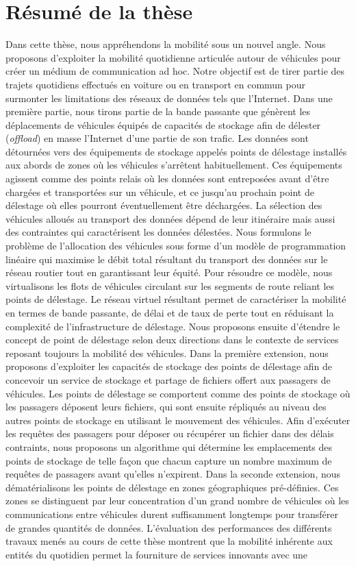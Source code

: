 
\chapter*{Résumé de la thèse}

Dans cette thèse, nous appréhendons la mobilité sous un nouvel angle. Nous proposons d’exploiter la mobilité quotidienne articulée autour de véhicules pour créer un médium de communication ad hoc. Notre objectif est de tirer partie des trajets quotidiens effectués en voiture ou en transport en commun pour surmonter les limitations des réseaux de données tels que l’Internet. Dans une première partie, nous tirons partie de la bande passante que génèrent les déplacements de véhicules équipés de capacités de stockage afin de délester (\textit{offload}) en masse l’Internet d’une partie de son trafic. Les données sont détournées vers des équipements de stockage appelés points de délestage installés aux abords de zones où les véhicules s’arrêtent habituellement. Ces équipements agissent comme des points relais où les données sont entreposées avant d’être chargées et transportées sur un véhicule, et ce jusqu’au prochain point de délestage où elles pourront éventuellement être déchargées. La sélection des véhicules alloués au transport des données dépend de leur itinéraire mais aussi des contraintes qui caractérisent les données délestées. Nous formulons le problème de l’allocation des véhicules sous forme d’un modèle de programmation linéaire qui maximise le débit total résultant du transport des données sur le réseau routier tout en garantissant leur équité. Pour résoudre ce modèle, nous virtualisons les flots de véhicules circulant sur les segments de route reliant les points de délestage. Le réseau virtuel résultant permet de caractériser la mobilité en termes de bande passante, de délai et de taux de perte tout en réduisant la complexité de l’infrastructure de délestage. Nous proposons ensuite d’étendre le concept de point de délestage selon deux directions dans le contexte de services reposant toujours la mobilité des véhicules. Dans la première extension, nous proposons d’exploiter les capacités de stockage des points de délestage afin de concevoir un service de stockage et partage de fichiers offert aux passagers de véhicules. Les points de délestage se comportent comme des points de stockage où les passagers déposent leurs fichiers, qui sont ensuite répliqués au niveau des autres points de stockage en utilisant le mouvement des véhicules. Afin d’exécuter les requêtes des passagers pour déposer ou récupérer un fichier dans des délais contraints, nous proposons un algorithme qui détermine les emplacements des points de stockage de telle façon que chacun capture un nombre maximum de requêtes de passagers avant qu’elles n’expirent. Dans la seconde extension, nous dématérialisons les points de délestage en zones géographiques pré-définies. Ces zones se distinguent par leur concentration d’un grand nombre de véhicules où les communications entre véhicules durent suffisamment longtemps pour transférer de grandes quantités de données. L’évaluation des performances des différents travaux menés au cours de cette thèse montrent que la mobilité inhérente aux entités du quotidien permet la fourniture de services innovants avec une 